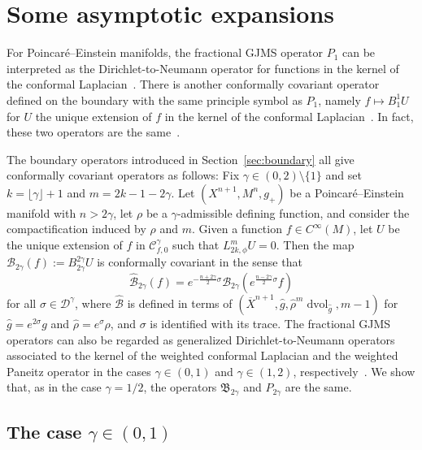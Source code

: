\documentclass{amsart}
\theoremstyle{definition}
\theoremstyle{remark}
\numberwithin{equation}{section}
\begin{document}
\section{Some asymptotic expansions}
\label{sec:asymptotics}

For Poincar\'e--Einstein manifolds, the fractional GJMS operator $P_1$ can be interpreted as the Dirichlet-to-Neumann operator for functions in the kernel of the conformal Laplacian~\cite{ChangGonzalez2011}.  There is another conformally covariant operator defined on the boundary with the same principle symbol as $P_1$, namely $f\mapsto B_{1}^{1}U$ for $U$ the unique extension of $f$ in the kernel of the conformal Laplacian~\cite{Branson1997}.  In fact, these two operators are the same~\cite{GuillarmouGuillope2007}.

The boundary operators introduced in Section~\ref{sec:boundary} all give conformally covariant operators as follows: Fix $\gamma\in(0,2)\setminus\{1\}$ and set $k=\lfloor\gamma\rfloor+1$ and $m=2k-1-2\gamma$.  Let $(X^{n+1},M^n,g_+)$ be a Poincar\'e--Einstein manifold with $n>2\gamma$, let $\rho$ be a $\gamma$-admissible defining function, and consider the compactification induced by $\rho$ and $m$.  Given a function $f\in C^\infty(M)$, let $U$ be the unique extension of $f$ in ${\mathcal{C}}_{f,0}^\gamma$ such that $L_{2k,\phi}^mU=0$.  Then the map ${\mathcal{B}}_{2\gamma}(f):=B_{2\gamma}^{2\gamma}U$ is conformally covariant in the sense that
\[ {\widehat{\mathcal{B}}}_{2\gamma}(f) = e^{-\frac{n+2\gamma}{2}\sigma}{\mathcal{B}}_{2\gamma}\left(e^{\frac{n-2\gamma}{2}\sigma}f\right) \]
for all $\sigma\in{\mathcal{D}}^\gamma$, where ${\widehat{\mathcal{B}}}$ is defined in terms of $({\overline{X}}^{n+1},{\widehat{g}},{\widehat{\rho}}^m\operatorname{dvol}_{\widehat{g}},m-1)$ for ${\widehat{g}}=e^{2\sigma}g$ and ${\widehat{\rho}}=e^\sigma\rho$, and $\sigma$ is identified with its trace.  The fractional GJMS operators can also be regarded as generalized Dirichlet-to-Neumann operators associated to the kernel of the weighted conformal Laplacian and the weighted Paneitz operator in the cases $\gamma\in(0,1)$ and $\gamma\in(1,2)$, respectively~\cite{CaseChang2013}.  We show that, as in the case $\gamma=1/2$, the operators ${\mathfrak{B}}_{2\gamma}$ and $P_{2\gamma}$ are the same.

\subsection{The case $\gamma\in(0,1)$}
\label{subsec:asymptotics/1}
\end{document}
